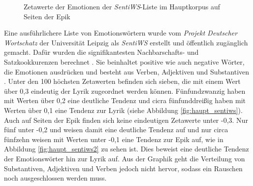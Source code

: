 \documentclass[a4paper,10p]{article}
\begin{document}
\begin{figure}{}
\begin{minipage}[b]{.45\linewidth}
        \caption{Zetawerte der Emotionen der \textit{SentiWS}-Liste im Hauptkorpus auf Seiten der Epik}  
        \label{haupt_sentiws2}
    \end{minipage}
\end{figure}

Eine ausführlichere Liste von Emotionswörtern wurde vom \textit{Projekt Deutscher Wortschatz} der Universität Leipzig als \textit{SentiWS} erstellt und öffentlich zugänglich gemacht. Dafür wurden die signifikantesten Nachbarschafts- und Satzkookkurenzen berechnet \citep{Sentiws}. Sie beinhaltet positive wie auch negative Wörter, die Emotionen ausdrücken und besteht aus Verben, Adjektiven und Substantiven \citep[vgl.]{Remus}. Unter den 100 höchsten Zetawerten befinden sich sieben, die mit einem Wert über 0,3 eindeutig der Lyrik zugeordnet werden können. Fünfundzwanzig haben mit Werten über 0,2 eine deutliche Tendenz und cicra fünfunddreißig haben mit Werten über 0,1 eine Tendenz zur Lyrik (siehe Abbildung \ref{fig:haupt_sentiws}). Auch auf Seiten der Epik finden sich keine eindeutigen Zetawerte unter -0,3. Nur fünf unter -0,2 und weisen damit eine deutliche Tendenz auf und nur circa fünfzehn weisen mit Werten unter -0,1 eine Tendenz zur Epik auf, wie in Abbildung \ref{fig:haupt_sentiws2} zu sehen ist. Dies beweist eine deutliche Tendenz der Emotionswörter hin zur Lyrik auf. Aus der Graphik geht die Verteilung von Substantiven, Adjektiven und Verben jedoch nicht hervor, sodass ein Rauschen noch ausgeschlossen werden muss. \par 
\end{document}
